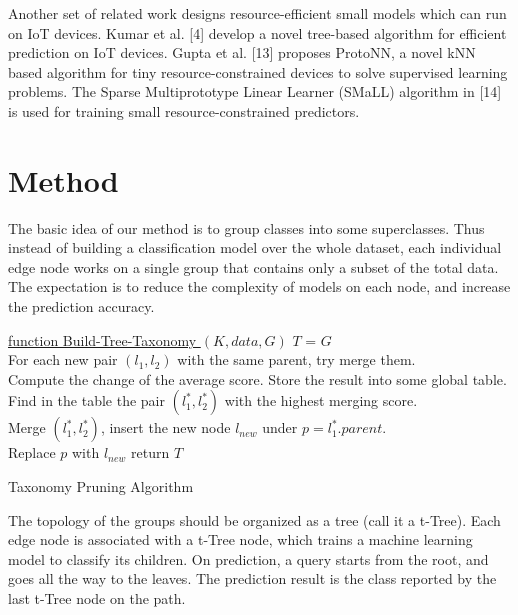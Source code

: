 \documentclass{article}
\begin{document}
Another set of related work designs resource-efficient small models which can run on IoT devices.  Kumar et al. [4] develop a novel tree-based algorithm for efficient prediction on IoT devices. Gupta et al. [13] proposes ProtoNN, a novel kNN based algorithm for tiny resource-constrained devices to solve supervised learning problems. The Sparse Multiprototype Linear Learner (SMaLL) algorithm in [14] is used for training small resource-constrained predictors.

\section{Method}
The basic idea of our method is to group classes into some superclasses. Thus instead of building a classification model over the whole dataset, each individual edge node works on a single group that contains only a subset of the total data. The expectation is to reduce the complexity of models on each node, and increase the prediction accuracy.


\begin{algorithm}[H]\label{ag:taxonomy}

    \underline{function Build-Tree-Taxonomy $(K, data, G)$}\;
    $T$ = $G$ \\
      {
        For each new pair $(l_1,l_2)$ with the same parent, try merge them. \\
        Compute the change of the average score. Store the result into some global table.\\
        Find in the table the pair $(l_1^*,l_2^*)$ with the highest merging score.\\
        Merge $(l_1^*,l_2^*)$, insert the new node $l_{new}$ under $p = l_1^*.parent$.\\
        {
            Replace $p$ with $l_{new}$
        }
      }
    return $T$
    \caption{Taxonomy Pruning Algorithm}
\end{algorithm}

The topology of the groups should be organized as a tree (call it a t-Tree). Each edge node is associated with a t-Tree node, which trains a machine learning model to classify its children. On prediction, a query starts from the root, and goes all the way to the leaves. The prediction result is the class reported by the last t-Tree node on the path.
\end{document}
